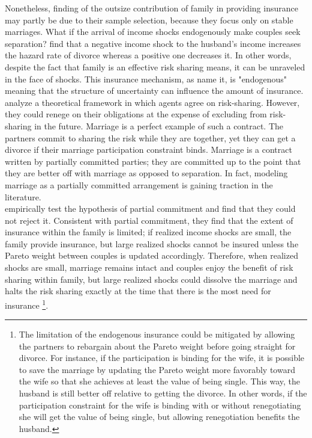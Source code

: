 Nonetheless, \citet{Blundell_etal_2015_Con-Ineq} finding of the outsize contribution of family in providing insurance 
may partly be due to their sample selection, because they focus only on stable marriages. What if the arrival of income shocks endogenously make couples seek separation? \citet{Weiss_Willis_1997} find that a negative income shock to the husband's income increases the hazard rate of divorce whereas a positive one decreases it. In other words, despite the fact that family is an effective risk sharing means, it can be unraveled in the face of shocks. This insurance mechanism, as \citet{Krueger_Perri_2006_RES} name it, is "endogenous" meaning that the structure of uncertainty can influence the amount of insurance. \citet{Krueger_Perri_2006_RES} analyze a theoretical framework in which agents agree on risk-sharing. However, they could renege on their obligations at the expense of excluding from risk-sharing in the future. Marriage is a perfect example of such a contract. The partners commit to sharing the risk while they are together, yet they can get a divorce if their marriage participation constraint binds. Marriage is a contract written by partially committed parties; they are committed up to the point that they are better off with marriage as opposed to separation. In fact, modeling marriage as a partially committed arrangement is gaining traction in the literature. \citep{Chiappori_Mazzocco_2014, Mazzocco_etal_2013, Voena_2015} \\ 

\citet{Lise_Yamada_2014} empirically test the hypothesis of partial commitment and find that they could not reject it. Consistent with partial commitment, they find that the extent of insurance within the family is limited; if realized income shocks are small, the family provide insurance, but large realized shocks cannot be insured unless the Pareto weight between couples is updated accordingly. Therefore, when realized shocks are small, marriage remains intact and couples enjoy the benefit of risk sharing within family, but large realized shocks could dissolve the marriage and halts the risk sharing exactly at the time that there is the most need for insurance \footnote{ The limitation of the endogenous insurance could be mitigated by allowing the partners to rebargain about the Pareto weight before going straight for divorce. For instance, if the participation is binding for the wife, it is possible to save the marriage by updating the Pareto weight more favorably toward the wife so that she achieves at least the value of being single. This way, the husband is still better off relative to getting the divorce. In other words, if the participation constraint for the wife is binding with or without renegotiating she will get the value of being single, but allowing renegotiation benefits the husband.}.\\ 

